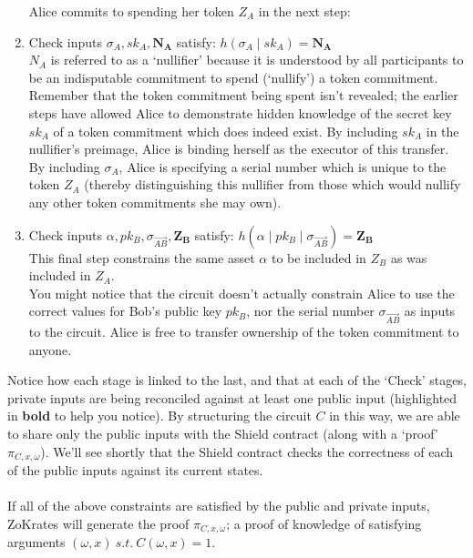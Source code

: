\documentclass{article}
\begin{document}
\begin{enumerate}
  Alice commits to spending her token $Z_A$ in the next step:
  \item Check inputs $\sigma_{A}, sk_A, \bm{N_A}$ satisfy:
    $h(\sigma_{A}\;|\;sk_A) = \bm{N_{A}}$\\
    $N_A$ is referred to as a `nullifier' because it is understood by all participants to be an indisputable commitment to spend (`nullify') a token commitment. Remember that the token commitment being spent isn't revealed; the earlier steps have allowed Alice to demonstrate hidden knowledge of the secret key $sk_A$ of a token commitment which does indeed exist. By including $sk_A$ in the nullifier's preimage, Alice is binding herself as the executor of this transfer. By including $\sigma_A$, Alice is specifying a serial number which is unique to the token $Z_A$ (thereby distinguishing this nullifier from those which would nullify any other token commitments she may own).\\
  \item Check inputs $\alpha, pk_B, \sigma_{\vec{AB}}, \bm{Z_B}$ satisfy:
    $h(\alpha\;|\;pk_B\;|\;\sigma_{\vec{AB}}) = \bm{Z_B}$\\
    This final step constrains the same asset $\alpha$ to be included in $Z_B$ as was included in $Z_A$.\\
    You might notice that the circuit doesn't actually constrain Alice to use the correct values for Bob's public key $pk_B$, nor the serial number $\sigma_{\vec{AB}}$ as inputs to the circuit. Alice is free to transfer ownership of the token commitment to anyone.
\end{enumerate}
Notice how each stage is linked to the last, and that at each of the `Check' stages, private inputs are being reconciled against at least one public input (highlighted in \textbf{bold} to help you notice). By structuring the circuit $C$ in this way, we are able to share only the public inputs with the Shield contract (along with a `proof' $\pi_{C,x,\omega}$). We'll see shortly that the Shield contract checks the correctness of each of the public inputs against its current states.\\
\\

\noindent
If all of the above constraints are satisfied by the public and private inputs, ZoKrates will generate the proof $\pi_{C,x,\omega}$; a proof of knowledge of satisfying arguments $(\omega, x) \ s.t. \ C(\omega, x) = 1$.
\end{document}

